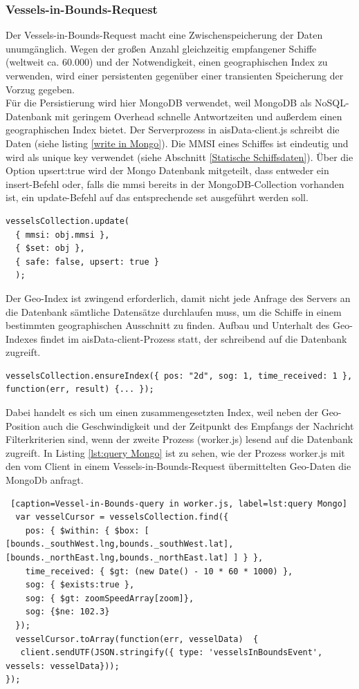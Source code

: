 \subsubsection{Vessels-in-Bounds-Request}\label{Vessels-in-Bounds-Request}
Der Vessels-in-Bounds-Request macht eine Zwischenspeicherung der Daten unumgänglich. Wegen der großen Anzahl gleichzeitig empfangener Schiffe (weltweit ca. 60.000) und der Notwendigkeit, einen geographischen Index zu verwenden, wird einer persistenten gegenüber einer transienten Speicherung der Vorzug gegeben. 
\\Für die Persistierung wird hier MongoDB verwendet, weil MongoDB als NoSQL-Datenbank mit geringem Overhead schnelle Antwortzeiten und außerdem einen geographischen Index bietet. Der Serverprozess in aisData-client.js schreibt die Daten (siehe listing \ref{write in Mongo}). Die MMSI eines Schiffes ist eindeutig und wird als unique key verwendet (siehe Abschnitt \ref{Statische Schiffsdaten}). Über die Option upsert:true wird der Mongo Datenbank mitgeteilt, dass entweder ein insert-Befehl oder, falls die mmsi bereits in der MongoDB-Collection vorhanden ist, ein update-Befehl auf das entsprechende set ausgeführt werden soll. 
\begin{lstlisting}[caption=Schreiben in die Datenbank in aisData-client.js, firstnumber=321, label=write in Mongo]
vesselsCollection.update(
  { mmsi: obj.mmsi },
  { $set: obj },
  { safe: false, upsert: true }
  );
\end{lstlisting}
Der Geo-Index ist zwingend erforderlich, damit nicht jede Anfrage des Servers an die Datenbank sämtliche Datensätze durchlaufen muss, um die Schiffe in einem bestimmten geographischen Ausschnitt zu finden. Aufbau und Unterhalt des Geo-Indexes findet im aisData-client-Prozess statt, der schreibend auf die Datenbank zugreift.
\begin{lstlisting}[caption=Aufbau des Geo-Indexes in aisData-client.js]
  vesselsCollection.ensureIndex({ pos: "2d", sog: 1, time_received: 1 }, function(err, result) {... });
  \end{lstlisting}
Dabei handelt es sich um einen zusammengesetzten Index, weil neben der Geo-Position auch die Geschwindigkeit und der Zeitpunkt des Empfangs der Nachricht Filterkriterien sind, wenn der zweite Prozess (worker.js) lesend auf die Datenbank zugreift. In Listing \ref{lst:query Mongo} ist zu sehen, wie der Prozess worker.js mit den vom Client in einem Vessels-in-Bounds-Request übermittelten Geo-Daten die MongoDb anfragt.
  \begin{lstlisting} [caption=Vessel-in-Bounds-query in worker.js, label=lst:query Mongo]
  var vesselCursor = vesselsCollection.find({
    pos: { $within: { $box: [ [bounds._southWest.lng,bounds._southWest.lat], [bounds._northEast.lng,bounds._northEast.lat] ] } },
    time_received: { $gt: (new Date() - 10 * 60 * 1000) },
    sog: { $exists:true },
    sog: { $gt: zoomSpeedArray[zoom]},
    sog: {$ne: 102.3}
  });
  vesselCursor.toArray(function(err, vesselData)  {
   client.sendUTF(JSON.stringify({ type: 'vesselsInBoundsEvent', vessels: vesselData}));
});
\end{lstlisting}


